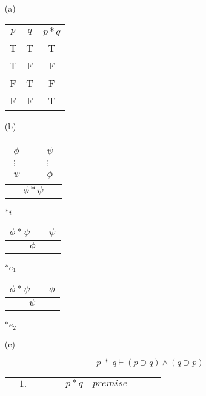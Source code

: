 \documentclass[11pt,a4paper]{article}
\begin{document}
\begin{itemize}
\item[(a)] \
\begin{table}[H]
\centering
\begin{tabular}{ c | c | c }
 $p$ & $q$ & $p * q$ \\
 \hline
 T & T & T \\
 \hline
 T & F & F \\
 \hline
 F & T & F \\
 \hline
 F & F & T
\end{tabular}
\end{table}

\item[(b)] \

\begin{table}[H]
\centering
\begin{tabular}{ c }
 $\boxed{
\begin{array}{rcl}
\phi \\
\vdots \\
\psi
\end{array}
} \qquad \boxed{
\begin{array}{rcl}
\psi \\
\vdots \\
\phi
\end{array}
} $
\vspace{0.2 cm}\\
 \hline
  $\phi * \psi$
\end{tabular}
$*i$ \qquad
\begin{tabular}{ c }
 $\phi * \psi \qquad \psi$\\
 \hline
  $\phi$
\end{tabular}
$*e_1$ \qquad
\begin{tabular}{ c }
 $\phi * \psi \qquad \phi$\\
 \hline
  $\psi$
\end{tabular}
$*e_2$
\end{table}


\item[(c)] 


$$p\;*\;q \vdash (p \supset q) \wedge (q \supset p)$$

		\begin{table}[H]
		\centering
		\begin{tabular}{*{10}{l}}
			
			& $1.$ & & & & $p * q$ & $premise$ & & &\\
			
			\cline{3-10}
			

\end{tabular}
\end{table}
\end{itemize}
\end{document}
